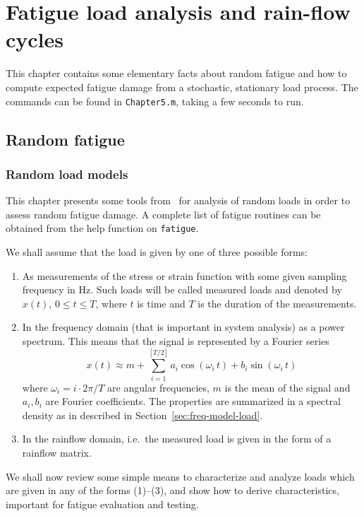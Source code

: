 %
\chapter{Fatigue load analysis and rain-flow cycles}
\label{cha:5}
This chapter contains some elementary facts about random fatigue and
how to compute expected fatigue damage from a stochastic, stationary
load process. The commands can be found in
\verb+Chapter5.m+, taking a few seconds to run.
\section{Random fatigue}
\label{sec:randomfatigue}
\subsection{Random load models}
\label{sec:loadmodels}
This chapter presents some tools from \progname ~for
analysis of random loads in order to assess random fatigue
damage. A complete list of fatigue routines can be obtained
from the help function on {\tt fatigue}. 

We shall assume that the load is given by one of
three possible forms:
\begin{enumerate}
\item As measurements of the stress or strain function with some given
sampling frequency in Hz. Such loads will be called measured loads
and denoted by $x(t)$, $0\le t\le T$, where $t$ is time and $T$ is the
duration of the measurements.
\item In the frequency domain (that is important in system analysis)
as a power spectrum. This means that the signal is represented by a
Fourier series
\begin{displaymath}
x(t)\approx
m + \sum_{i=1}^{[T/2]} a_i\cos(\omega_i\,t)+b_i
\sin(\omega_i\,t)
\end{displaymath}
where $\omega_i=i\cdot 2\pi/T$ are angular
frequencies,
$m$ is the mean of the signal and $a_i,b_i$ are Fourier coefficients.
The properties are summarized in a spectral density as in described in
Section~\ref{sec:freq-model-load}.
\item In the rainflow domain, i.e.\ the measured load is given in the
form of a rainflow matrix.
\end{enumerate}

We shall now review some simple means to characterize
and analyze loads which are given in any of the forms (1)--(3), and
show how to derive characteristics, important for fatigue evaluation
and testing.

